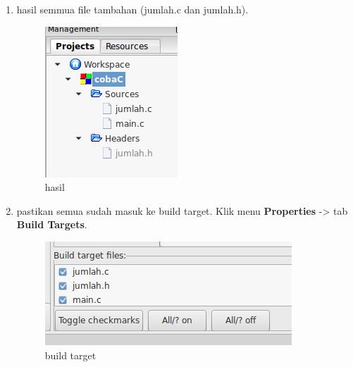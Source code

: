 \documentclass[12pt,]{article}
\begin{document}
\begin{enumerate}
		\item hasil semmua file tambahan (jumlah.c dan jumlah.h).
		\begin{figure}[H]
			\centering
			\includegraphics[width=0.35\linewidth]{images/c_mul_3}
			\caption{hasil}
		\end{figure}

		\item pastikan semua sudah masuk ke build target.
		Klik menu \textbf{Properties} -> tab \textbf{Build Targets}.
		\begin{figure}[H]
			\centering
			\includegraphics[width=0.35\linewidth]{images/c_mul_4}
			\caption{build target}
		\end{figure}
	\end{enumerate}
\end{document}
